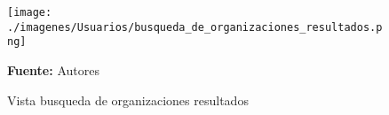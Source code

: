\begin{figure}[!htb]
  \begin{center}
\texttt{[image: ./imagenes/Usuarios/busqueda\_de\_organizaciones\_resultados.png]}
    \caption{Vista busqueda de organizaciones resultados}
    \label{fig:Vista_busqueda_de_organizaciones_resultados}
    \textbf{Fuente:}  Autores
  \end{center}
\end{figure}
